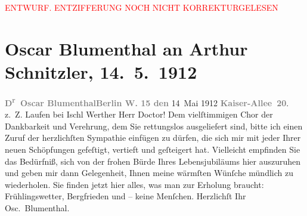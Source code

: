 
\begin{center}
            \textcolor{red}{ENTWURF. ENTZIFFERUNG NOCH NICHT KORREKTURGELESEN}
                      \end{center}
            
               \section[Oscar Blumenthal an Arthur Schnitzler, 14. 5. 1912]{ Oscar Blumenthal an Arthur Schnitzler, 14. 5. 1912}\nopagebreak{}\rehead{ }\begin{ledgroupsized}[t]{13cm}\normalsize\beginnumbering{} \toendnotes[C]{\smallbreak\pagebreak[2]} 
\toendnotes[C]{\smallbreak}\pstart
           {\pb}\textcolor{gray}{\textbf{D\textsuperscript{r} Oscar
                                Blumenthal}}\hfill \textcolor{gray}{\textbf{Berlin W. 15 den}}{ }14 Mai 1912\pend
           \pstart
           \raggedleft{}\textcolor{gray}{\textbf{Kaiser-Allee 20}}.{\\}z. Z. Laufen bei Ischl\pend
           \pstart\center{}Werther Herr Doctor!\pend\pstart
           Dem vielſtimmigen Chor der Dankbarkeit und Verehrung, dem Sie \label{K_L02064_1v}\label{K_L02064_1h} rettungslos ausgeliefert sind, bitte
                    ich einen Zuruf der herzlichſten Sympathie einfügen zu dürfen, die sich mir mit
                    jeder Ihrer neuen Schöpfungen gefeſtigt, vertieft und geſteigert hat. Vielleicht
                    empfinden Sie das Bedürfniß, sich von der frohen Bürde Ihres Lebensjubiläums
                    hier auszuruhen und geben mir dann Gelegenheit, Ihnen meine wärmſten Wünſche
                    mündlich zu wiederholen. Sie finden jetzt hier alles, was man zur Erholung
                    braucht: Frühlingswetter, Bergfrieden und – keine Menſchen. Herzlichſt Ihr\pend
           \pstart \spacefill\mbox{Osc. Blumenthal.}\pend{}\endnumbering{}\end{ledgroupsized}  \newcommand{\dateiname}{L02064}\newcommand{\titel}{Oscar Blumenthal an Arthur Schnitzler, 14. 5. 1912}\newcommand{\editorInnen}{Martin Anton Müller und Gerd-Hermann Susen}
      